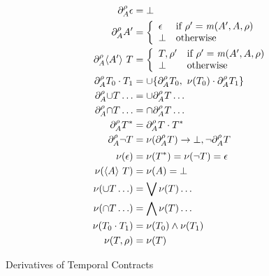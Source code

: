   {\begin{align*}
      \partial_{A}^{\rho}{\epsilon} &= \bot
      \\
      \partial_{A}^{\rho}{A'} &= \left\{
        \begin{array}{ll}
          \epsilon & \text{if } \rho' = \mathit{m}(A', A, \rho) \\
          \bot & \text{otherwise}
        \end{array}\right.
      \\
      \partial_{A}^{\rho}{\langle A'\rangle\ T} &=
      \left\{\begin{array}{ll}
          T,\rho' & \text{if } \rho' = \mathit{m}(A', A, \rho) \\
          \bot & \text{otherwise}
        \end{array}\right.
      \\
      \partial_{A}^{\rho}{T_0 \cdot T_1} &=
      \cup \{\partial_{A}^{\rho}{T_0},\
          \nu(T_0) \cdot \partial_{A}^{\rho}{T_1}\}
      \\
      \partial_{A}^{\rho}{\cup T\ldots} &=
      \cup \partial_{A}^{\rho}{T}\ldots
      \\
      \partial_{A}^{\rho}{\cap T\ldots} &=
      \cap \partial_{A}^{\rho}{T}\ldots
      \\
      \partial_{A}^{\rho}{T^*} &=
      \partial_{A}^{\rho}{T} \cdot T^*
      \\
      \partial_{A}^{\rho}{\neg T} &=
      \nu(\partial_{A}^{\rho}{T}) \to \bot,
      \neg \partial_{A}^{\rho}{T}
      \\[2pt]
      \nu(\epsilon) &= \nu(T^*) =
      \nu(\neg T) = \epsilon
      \\
      \nu(\langle A\rangle\ T) &= \nu(A) = \bot
      \\
      \nu(\cup T\ldots) &=
      \bigvee{\nu(T)\ldots}
      \\
      \nu(\cap T\ldots) &=
      \bigwedge{\nu(T)\ldots}
      \\
      \nu(T_0 \cdot T_1) &=
      \nu(T_0)\wedge \nu(T_1)
      \\
      \nu(T,\rho) &= \nu(T)
    \end{align*}}{\caption{Derivatives of Temporal Contracts}\label{fig:tcon-deriv}}

